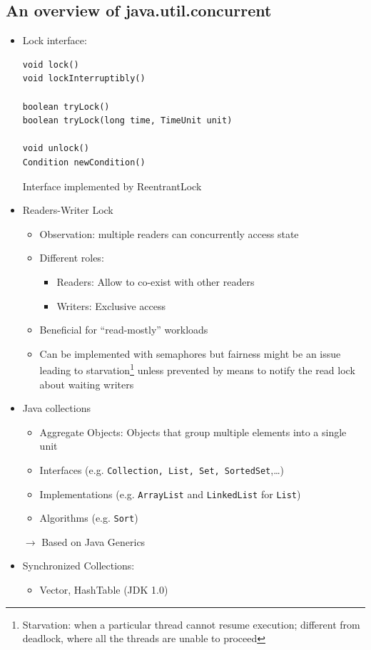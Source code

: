\documentclass[a4paper]{article}
\newcommand{\inline}[1]{\lstinline!#1!}%
\begin{document}
\subsection{An overview of java.util.concurrent}
\begin{itemize}
\item Lock interface:
\begin{lstlisting}
void lock()
void lockInterruptibly()

boolean tryLock()
boolean tryLock(long time, TimeUnit unit)

void unlock()
Condition newCondition()
\end{lstlisting}
Interface implemented by ReentrantLock


\item Readers-Writer Lock
\begin{itemize}
\item Observation: multiple readers can concurrently access state
\item Different roles:
\begin{itemize}
\item Readers: Allow to co-exist with other readers
\item Writers: Exclusive access
\end{itemize}
\item Beneficial for ``read-mostly'' workloads
\item Can be implemented with semaphores but fairness might be an issue leading to starvation\footnote{Starvation: when a particular thread cannot resume execution; different from deadlock, where all the threads are unable to proceed}  unless prevented by means to notify the read lock about waiting writers
\end{itemize} 
\item Java collections
\begin{itemize}
\item Aggregate Objects: Objects that group multiple elements into a single unit
\item Interfaces (e.g. \inline{Collection, List, Set, SortedSet},\dots)
\item Implementations (e.g. \inline{ArrayList} and \inline{LinkedList} for \inline{List})
\item Algorithms (e.g. \inline{Sort})
\end{itemize}
$\to$ Based on Java Generics
\item Synchronized Collections: 
\begin{itemize}
\item Vector, HashTable (JDK 1.0)

\end{itemize}
\end{itemize}
\end{document}
